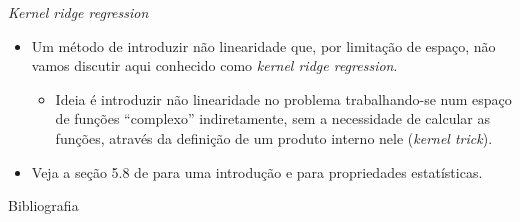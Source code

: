 \documentclass[11pt]{beamer}
\begin{document}
\begin{frame}{\textit{Kernel ridge regression}}
\begin{itemize}
	\item Um método de introduzir não linearidade que, por limitação de espaço, não vamos discutir aqui  conhecido como \textit{kernel ridge regression}.
	\begin{itemize}
		\item Ideia é introduzir não linearidade no problema trabalhando-se num espaço de funções ``complexo'' indiretamente, sem a necessidade de calcular as funções, através da definição de um produto interno nele (\textit{kernel trick}).
		
	\end{itemize}
	\item Veja a seção 5.8 de \citet{hastie2009elements} para uma introdução e \citet{singh2023kernelridgeregressioninference} para propriedades estatísticas.
\end{itemize}
\end{frame}

	\appendix
		\begin{frame}[allowframebreaks]{Bibliografia}
	\printbibliography

	\end{frame}
\end{document}
